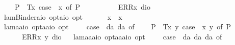 \begin{isabellebody}
\ \ \ \ P{\isacharparenleft}{\isacharunderscore}{\isacharparenright}\ {\isasymRightarrow}\ T{\isacharparenleft}{\isasymlambda}x{\isachardot}\ case\ {\isacharparenleft}{\isasymPhi}\ x{\isacharparenright}\ of\ P{\isacharparenleft}{\isasymphi}{\isacharparenright}\ {\isasymRightarrow}\ {\isasymphi}{\isacharparenright}\ {\isacharbar}\ \isanewline
\ \ \ \ {\isacharunderscore}\ {\isasymRightarrow}\ ERR{\isacharparenleft}{\isasymlambda}x{\isachardot}\ dio{\isacharparenright}{\isachardoublequoteclose}\isanewline
\ \isamarkupfalse%
\ lamBinder{\isacharcolon}{\isacharcolon}{\isachardoublequoteopen}{\isacharparenleft}{\isacharprime}a{\isasymRightarrow}io\ opt{\isacharparenright}{\isasymRightarrow}{\isacharparenleft}{\isacharprime}a{\isasymRightarrow}io{\isacharparenright}\ opt{\isachardoublequoteclose}\ {\isacharparenleft}\ {\isachardoublequoteopen}\isactrlbold {\isasymlambda}{\isachardoublequoteclose}\ {\isacharbrackleft}{}{\isacharbrackright}\ {}{\isacharparenright}\ \ \ {\isachardoublequoteopen}\isactrlbold {\isasymlambda}x{\isachardot}\ {\isasymphi}\ x\ {\isasymequiv}\ \isactrlbold {\isasymlambda}\ {\isasymphi}{\isachardoublequoteclose}\isanewline
\ \isamarkupfalse%
\ lam{}{\isacharcolon}{\isacharcolon}{\isachardoublequoteopen}{\isacharparenleft}{\isacharprime}a{\isasymRightarrow}{\isacharprime}a{\isasymRightarrow}io\ opt{\isacharparenright}{\isasymRightarrow}{\isacharparenleft}{\isacharprime}a{\isasymRightarrow}{\isacharprime}a{\isasymRightarrow}io{\isacharparenright}\ opt{\isachardoublequoteclose}\ {\isacharparenleft}{\isachardoublequoteopen}\isactrlbold {\isasymlambda}\ \ {\isachardoublequoteopen}\isactrlbold {\isasymlambda}\ {\isasymequiv}\ case\ {\isacharparenleft}{\isasymPhi}\ da\ da{\isacharparenright}\ of\isanewline
\ \ \ \ P{\isacharparenleft}{\isacharunderscore}{\isacharparenright}\ {\isasymRightarrow}\ T{\isacharparenleft}{\isasymlambda}x\ y{\isachardot}\ case\ {\isacharparenleft}{\isasymPhi}\ x\ y{\isacharparenright}\ of\ P{\isacharparenleft}{\isasymphi}{\isacharparenright}\ {\isasymRightarrow}\ {\isasymphi}{\isacharparenright}\ {\isacharbar}\ \isanewline
\ \ \ \ {\isacharunderscore}\ {\isasymRightarrow}\ ERR{\isacharparenleft}{\isasymlambda}x\ y{\isachardot}\ dio{\isacharparenright}{\isachardoublequoteclose}\isanewline
\ \isamarkupfalse%
\ lam{}{\isacharcolon}{\isacharcolon}{\isachardoublequoteopen}{\isacharparenleft}{\isacharprime}a{\isasymRightarrow}{\isacharprime}a{\isasymRightarrow}{\isacharprime}a{\isasymRightarrow}io\ opt{\isacharparenright}{\isasymRightarrow}{\isacharparenleft}{\isacharprime}a{\isasymRightarrow}{\isacharprime}a{\isasymRightarrow}{\isacharprime}a{\isasymRightarrow}io{\isacharparenright}\ opt{\isachardoublequoteclose}\ {\isacharparenleft}{\isachardoublequoteopen}\isactrlbold {\isasymlambda}\ \ {\isachardoublequoteopen}\isactrlbold {\isasymlambda}\ {\isasymequiv}\ case\ {\isacharparenleft}{\isasymPhi}\ da\ da\ da{\isacharparenright}\ of\isanewline

\end{isabellebody}
